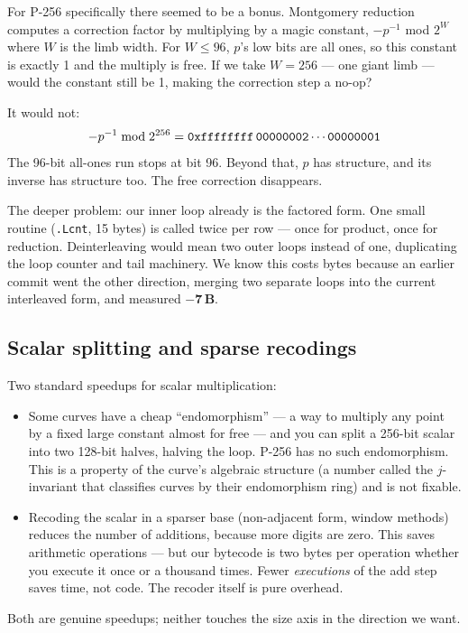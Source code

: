 \documentclass[11pt,a4paper]{article}
\newcommand{\saved}[1]{\textcolor{green!50!black}{\textbf{$-$#1\,B}}}
\begin{document}
For P-256 specifically there seemed to be a bonus. Montgomery
reduction computes a correction factor by multiplying by a magic
constant, $-p^{-1}$ mod $2^W$ where $W$ is the limb width. For $W \le
96$, $p$'s low bits are all ones, so this constant is exactly 1 and
the multiply is free. If we take $W = 256$ --- one giant limb --- would
the constant still be 1, making the correction step a no-op?

It would not:
\[
-p^{-1} \bmod 2^{256} = \texttt{0xffffffff\,00000002}\cdots\texttt{00000001}
\]
The 96-bit all-ones run stops at bit 96. Beyond that, $p$ has
structure, and its inverse has structure too. The free correction
disappears.

The deeper problem: our inner loop already is the factored
form. One small routine (\texttt{.Lcnt}, 15 bytes) is called twice per
row --- once for product, once for reduction. Deinterleaving would mean
two outer loops instead of one, duplicating the loop counter and tail
machinery. We know this costs bytes because an earlier commit went the
other direction, merging two separate loops into the current
interleaved form, and measured \saved{7}.

\subsection{Scalar splitting and sparse recodings}

Two standard speedups for scalar multiplication:
\begin{itemize}
\item Some curves have a cheap ``endomorphism'' --- a way to multiply
  any point by a fixed large constant almost for free --- and you can
  split a 256-bit scalar into two 128-bit halves, halving the loop.
  P-256 has no such endomorphism. This is a property of the curve's
  algebraic structure (a number called the $j$-invariant that
  classifies curves by their endomorphism ring) and is not fixable.
\item Recoding the scalar in a sparser base (non-adjacent form, window
  methods) reduces the number of additions, because more digits are
  zero. This saves arithmetic operations --- but our bytecode is two
  bytes per operation whether you execute it once or a thousand times.
  Fewer \emph{executions} of the add step saves time, not code. The
  recoder itself is pure overhead.
\end{itemize}
Both are genuine speedups; neither touches the size axis in the
direction we want.
\end{document}
